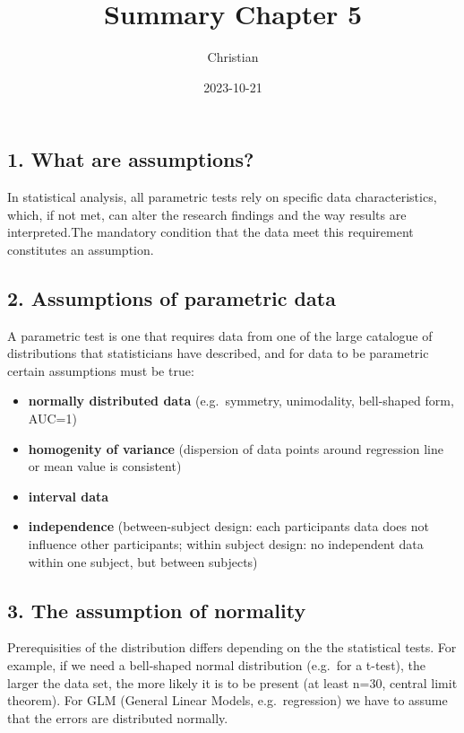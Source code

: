 \documentclass[
]{article}
\title{Summary Chapter 5}
\author{Christian}
\date{2023-10-21}
\begin{document}
\maketitle

\hypertarget{what-are-assumptions}{%
\subsection{1. What are assumptions?}\label{what-are-assumptions}}

In statistical analysis, all parametric tests rely on specific data
characteristics, which, if not met, can alter the research findings and
the way results are interpreted.The mandatory condition that the data
meet this requirement constitutes an assumption.

\hypertarget{assumptions-of-parametric-data}{%
\subsection{2. Assumptions of parametric
data}\label{assumptions-of-parametric-data}}

A parametric test is one that requires data from one of the large
catalogue of distributions that statisticians have described, and for
data to be parametric certain assumptions must be true:

\begin{itemize}
\item
  \textbf{normally distributed data} (e.g.~symmetry, unimodality,
  bell-shaped form, AUC=1)
\item
  \textbf{homogenity of variance} (dispersion of data points around
  regression line or mean value is consistent)
\item
  \textbf{interval data}
\item
  \textbf{independence} (between-subject design: each participants data
  does not influence other participants; within subject design: no
  independent data within one subject, but between subjects)
\end{itemize}

\hypertarget{the-assumption-of-normality}{%
\subsection{3. The assumption of
normality}\label{the-assumption-of-normality}}

Prerequisities of the distribution differs depending on the the
statistical tests. For example, if we need a bell-shaped normal
distribution (e.g.~for a t-test), the larger the data set, the more
likely it is to be present (at least n=30, central limit theorem). For
GLM (General Linear Models, e.g.~regression) we have to assume that the
errors are distributed normally.
\end{document}
